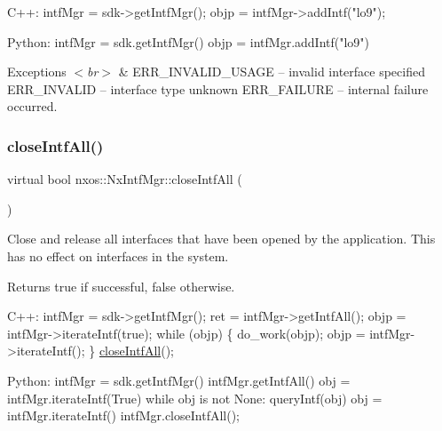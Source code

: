 \begin{DoxyCode}
C++:
   intfMgr = sdk->getIntfMgr();
   objp = intfMgr->addIntf(\textcolor{stringliteral}{"lo9"});

Python:
   intfMgr = sdk.getIntfMgr()
   objp = intfMgr.addIntf(\textcolor{stringliteral}{"lo9"})
\end{DoxyCode}



\begin{DoxyExceptions}{Exceptions}
{\em $<$br$>$} & E\+R\+R\+\_\+\+I\+N\+V\+A\+L\+I\+D\+\_\+\+U\+S\+A\+GE -- invalid interface specified E\+R\+R\+\_\+\+I\+N\+V\+A\+L\+ID -- interface type unknown E\+R\+R\+\_\+\+F\+A\+I\+L\+U\+RE -- internal failure occurred. \\
\hline
\end{DoxyExceptions}
\mbox{\label{classnxos_1_1_nx_intf_mgr_a45e7cb2a8e3919667c14264dd618168a}} 
\subsubsection{\texorpdfstring{close\+Intf\+All()}{closeIntfAll()}}
{\footnotesize\ttfamily virtual bool nxos\+::\+Nx\+Intf\+Mgr\+::close\+Intf\+All (\begin{DoxyParamCaption}{ }\end{DoxyParamCaption})\hspace{0.3cm}{\ttfamily [pure virtual]}}

Close and release all interfaces that have been opened by the application. This has no effect on interfaces in the system. ~\newline
 \begin{DoxyReturn}{Returns}
true if successful, false otherwise.
\end{DoxyReturn}

\begin{DoxyCode}
C++:
   intfMgr = sdk->getIntfMgr();
   ret = intfMgr->getIntfAll();
   objp = intfMgr->iterateIntf(\textcolor{keyword}{true});
   \textcolor{keywordflow}{while} (objp) \{
        do\_work(objp);
        objp = intfMgr->iterateIntf();
   \}
   \mbox{\hyperlink{classnxos_1_1_nx_intf_mgr_a45e7cb2a8e3919667c14264dd618168a}{closeIntfAll}}();     

Python:
   intfMgr = sdk.getIntfMgr()
   intfMgr.getIntfAll()  
   obj = intfMgr.iterateIntf(True)
   \textcolor{keywordflow}{while} obj is not None:
      queryIntf(obj)
      obj = intfMgr.iterateIntf()
   intfMgr.closeIntfAll();
\end{DoxyCode}



